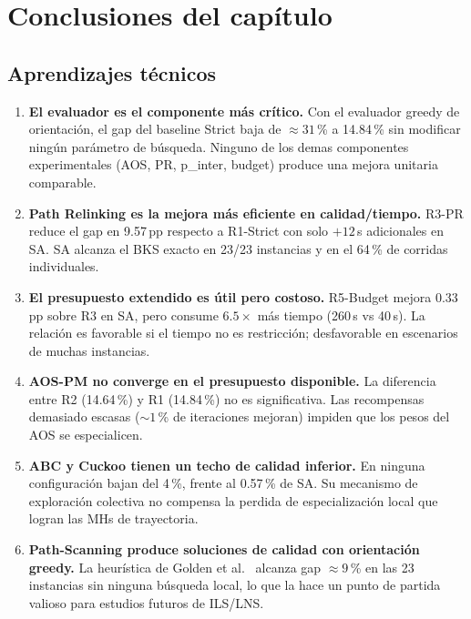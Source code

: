 \documentclass[11pt,a4paper]{article}
\theoremstyle{definition}
\theoremstyle{remark}
\begin{document}




\section{Conclusiones del capítulo}
\label{sec:conclusiones}

\subsection{Aprendizajes técnicos}

\begin{enumerate}
\item \textbf{El evaluador es el componente más crítico.} Con el
  evaluador greedy de orientación, el gap del baseline Strict baja de
  $\approx 31$\,\% a 14.84\,\% sin modificar ningún parámetro de
  búsqueda. Ninguno de los demas componentes experimentales (AOS, PR,
  p\_inter, budget) produce una mejora unitaria comparable.
\item \textbf{Path Relinking es la mejora más eficiente en calidad/tiempo.}
  R3-PR reduce el gap en 9.57\,pp respecto a R1-Strict con solo
  $+12$\,s adicionales en SA. SA alcanza el BKS exacto en 23/23
  instancias y en el 64\,\% de corridas individuales.
\item \textbf{El presupuesto extendido es útil pero costoso.} R5-Budget
  mejora 0.33\,pp sobre R3 en SA, pero consume $6.5\times$ más tiempo
  (260\,s vs 40\,s). La relación es favorable si el tiempo no es
  restricción; desfavorable en escenarios de muchas instancias.
\item \textbf{AOS-PM no converge en el presupuesto disponible.} La
  diferencia entre R2 (14.64\,\%) y R1 (14.84\,\%) no es significativa.
  Las recompensas demasiado escasas ($\sim 1$\,\% de iteraciones mejoran)
  impiden que los pesos del AOS se especialicen.
\item \textbf{ABC y Cuckoo tienen un techo de calidad inferior.} En
  ninguna configuración bajan del 4\,\%, frente al 0.57\,\% de SA.
  Su mecanismo de exploración colectiva no compensa la perdida de
  especialización local que logran las MHs de trayectoria.
\item \textbf{Path-Scanning produce soluciones de calidad con orientación
  greedy.} La heurística de Golden et al.~\cite{golden1983} alcanza gap $\approx 9$\,\%
  en las 23 instancias sin ninguna búsqueda local, lo que la hace
  un punto de partida valioso para estudios futuros de ILS/LNS.
\end{enumerate}
\end{document}
